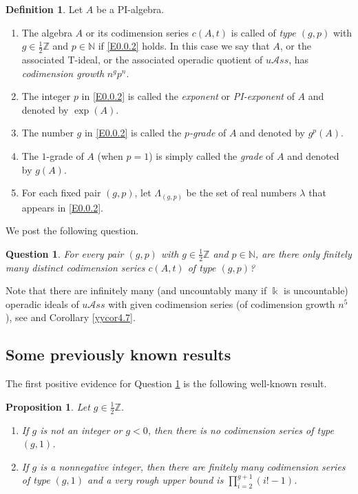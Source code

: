 \documentclass{amsart}
\newtheorem{que}[thm]{Question}
\newtheorem{prop}[thm]{Proposition}
\theoremstyle{definition}
\newtheorem{Def}[thm]{Definition}
\theoremstyle{remark}
\numberwithin{equation}{section}
\def \uas{u\mathcal{A}ss}
\begin{document}
\begin{Def}
\label{yydef0.1} 
Let $A$ be a PI-algebra.
\begin{enumerate}
\item[(1)]
The algebra $A$ or its codimension series $c(A,t)$ is called of {\it type $(g,p)$} with $g\in \frac{1}{2}{\mathbb Z}$ 
and $p\in {\mathbb N}$ if \eqref{E0.0.2} holds. 
In this case we say that $A$, or the associated T-ideal, 
or the associated operadic quotient of $\uas$, has {\it codimension growth} $n^g p^n$. 
\item[(2)] 
The integer $p$ in \eqref{E0.0.2} is called the {\it exponent} or {\it PI-exponent} of $A$ and denoted by $\exp(A)$. 
\item[(3)]
The number $g$ in \eqref{E0.0.2} is called the {\it $p$-grade} of $A$ and denoted by $g^p(A)$.
\item[(4)]
The $1$-grade of $A$ (when $p=1$) is simply called the {\it grade} of $A$ and denoted by $g(A)$.
\item[(5)]
For each fixed pair $(g,p)$, let $\Lambda_{(g,p)}$ be the set of real numbers $\lambda$ that appears in \eqref{E0.0.2}.
\end{enumerate} 
\end{Def}

We post the following question.

\begin{que}
\label{yyque0.2}
For every pair $(g,p)$ with $g\in \frac{1}{2}{\mathbb Z}$ and $p\in {\mathbb N}$, 
are there only finitely many distinct codimension series $c(A,t)$ of type $(g,p)$?
\end{que}

Note that there are infinitely many (and uncountably many if $\Bbbk$ is uncountable) operadic ideals of $\uas$ 
with given codimension series (of codimension growth $n^5$), 
see \cite[Section 5]{GMZ} and Corollary \ref{yycor4.7}.

\subsection{Some previously known results}
\label{yysec0.4}
The first positive evidence for Question \ref{yyque0.2} is the following well-known result.

\begin{prop}
\cite{BYZ, DrR, GMP}
\label{yypro0.3} 
Let $g\in \frac{1}{2}{\mathbb Z}$.
\begin{enumerate}
\item[(1)]
If $g$ is not an integer or $g<0$, then there is no codimension series of type $(g,1)$.
\item[(2)]
If $g$ is a nonnegative integer, then there are finitely many codimension series of type $(g,1)$ 
and a very rough upper bound is $\prod_{i=2}^{g+1} (i!-1)$.
\end{enumerate}
\end{prop}
\end{document}
